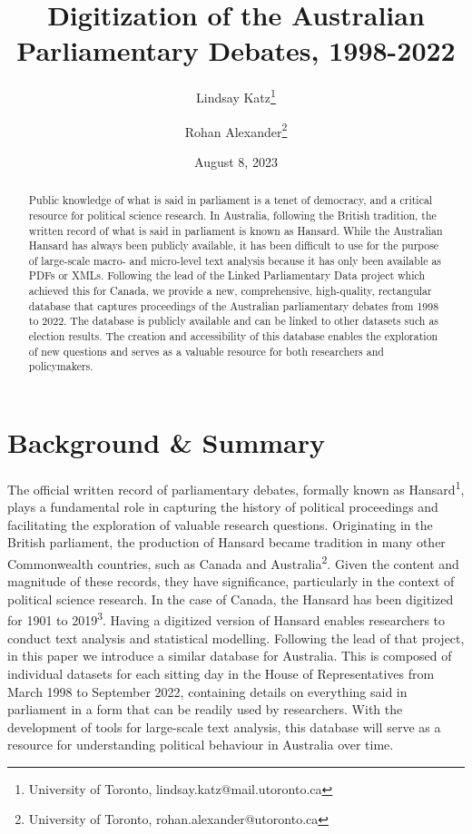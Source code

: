 \documentclass[
  letterpaper,
  DIV=11,
  numbers=noendperiod]{scrartcl}
\title{Digitization of the Australian Parliamentary Debates, 1998-2022}
\author{Lindsay Katz\footnote{University of Toronto,
  lindsay.katz@mail.utoronto.ca} \and Rohan Alexander\footnote{University
  of Toronto, rohan.alexander@utoronto.ca}}
\date{August 8, 2023}
\begin{document}
\maketitle
\begin{abstract}
Public knowledge of what is said in parliament is a tenet of democracy,
and a critical resource for political science research. In Australia,
following the British tradition, the written record of what is said in
parliament is known as Hansard. While the Australian Hansard has always
been publicly available, it has been difficult to use for the purpose of
large-scale macro- and micro-level text analysis because it has only
been available as PDFs or XMLs. Following the lead of the Linked
Parliamentary Data project which achieved this for Canada, we provide a
new, comprehensive, high-quality, rectangular database that captures
proceedings of the Australian parliamentary debates from 1998 to 2022.
The database is publicly available and can be linked to other datasets
such as election results. The creation and accessibility of this
database enables the exploration of new questions and serves as a
valuable resource for both researchers and policymakers.
\end{abstract}
\ifdefined\Shaded\renewenvironment{Shaded}{\begin{tcolorbox}[borderline west={3pt}{0pt}{shadecolor}, breakable, enhanced, frame hidden, sharp corners, boxrule=0pt, interior hidden]}{\end{tcolorbox}}\fi

\hypertarget{sec-intro}{%
\section{Background \& Summary}\label{sec-intro}}

The official written record of parliamentary debates, formally known as
Hansard\textsuperscript{1}, plays a fundamental role in capturing the
history of political proceedings and facilitating the exploration of
valuable research questions. Originating in the British parliament, the
production of Hansard became tradition in many other Commonwealth
countries, such as Canada and Australia\textsuperscript{2}. Given the
content and magnitude of these records, they have significance,
particularly in the context of political science research. In the case
of Canada, the Hansard has been digitized for 1901 to
2019\textsuperscript{3}. Having a digitized version of Hansard enables
researchers to conduct text analysis and statistical modelling.
Following the lead of that project, in this paper we introduce a similar
database for Australia. This is composed of individual datasets for each
sitting day in the House of Representatives from March 1998 to September
2022, containing details on everything said in parliament in a form that
can be readily used by researchers. With the development of tools for
large-scale text analysis, this database will serve as a resource for
understanding political behaviour in Australia over time.
\end{document}
